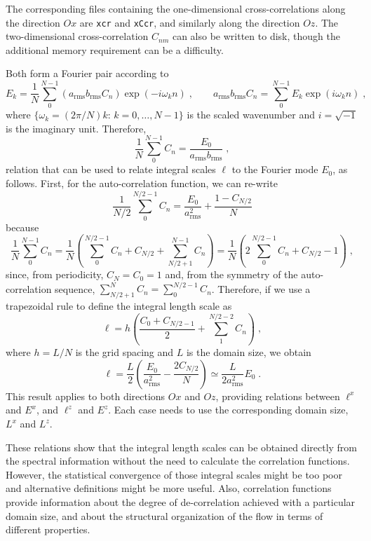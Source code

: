 The corresponding files containing the one-dimensional cross-correlations along
the direction $Ox$ are {\tt xcr} and {\tt xCcr}, and similarly along the
direction $Oz$. The two-dimensional cross-correlation $C_{nm}$ can also be
written to disk, though the additional memory requirement can be a difficulty.

Both form a Fourier pair according to
\begin{equation*}
E_k=\frac{1}{N}\sum_0^{N-1}(a_\mathrm{rms}b_\mathrm{rms}C_n)\exp(-i\omega_kn)\;,\qquad
a_\mathrm{rms}b_\mathrm{rms}C_n=\sum_0^{N-1}E_k\exp(i\omega_kn)\;,
\end{equation*}
where $\{\omega_k=(2\pi/N)k:\, k = 0,\ldots,N-1\}$ is the scaled wavenumber and
$i=\sqrt{-1}$ is the imaginary unit. Therefore,
\begin{equation}
\frac{1}{N}\sum_0^{N-1}C_n=\frac{E_0}{a_\mathrm{rms}b_\mathrm{rms}} \;,
\end{equation}
relation that can be used to relate integral scales $\ell$ to the Fourier mode
$E_0$, as follows. First, for the auto-correlation function, we can re-write
\begin{equation}
\frac{1}{N/2}\sum_0^{N/2-1}C_n=\frac{E_0}{a_\mathrm{rms}^2}+\frac{1-C_{N/2}}{N} 
\end{equation}
because
\begin{equation*}
\frac{1}{N}\sum_0^{N-1}C_n = \frac{1}{N}\left(\sum_0^{N/2-1}C_n
+C_{N/2}+\sum_{N/2+1}^{N-1}C_n\right) = \frac{1}{N}\left(2\sum_0^{N/2-1}C_n
+C_{N/2}-1\right) \;,
\end{equation*}
since, from periodicity, $C_N=C_0=1$ and, from the symmetry of the
auto-correlation sequence, $\sum_{N/2+1}^{N}C_n=\sum_0^{N/2-1}C_n$. Therefore,
if we use a trapezoidal rule to define the integral length scale as
\begin{equation}
\ell=h\left(\frac{C_0+C_{N/2-1}}{2}+\sum_1^{N/2-2}C_n\right)\;,
\end{equation}
where $h=L/N$ is the grid spacing and $L$ is the domain size, we obtain
\begin{equation}
\ell=\frac{L}{2}\left(\frac{E_0}{a_\mathrm{rms}^2}-\frac{2C_{N/2}}{N}\right)
\simeq \frac{L}{2a_\mathrm{rms}^2}E_0\;.
\end{equation}
This result applies to both directions $Ox$ and $Oz$, providing relations
between $\ell^x$ and $E^x$, and $\ell^z$ and $E^z$. Each case needs to use the
corresponding domain size, $L^x$ and $L^z$.

These relations show that the integral length scales can be obtained directly
from the spectral information without the need to calculate the correlation
functions. However, the statistical convergence of those integral scales might
be too poor and alternative definitions might be more useful. Also, correlation
functions provide information about the degree of de-correlation achieved with a
particular domain size, and about the structural organization of the flow in
terms of different properties.

